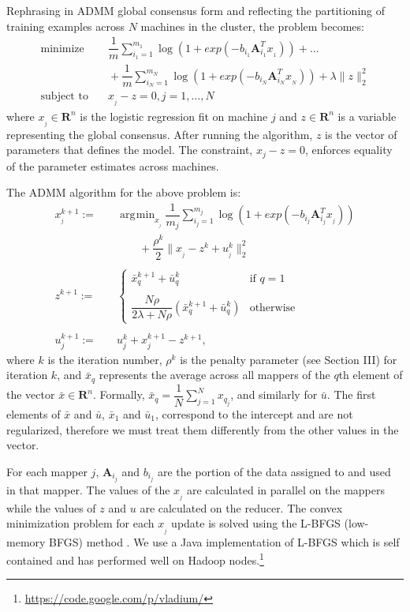 \documentclass[10pt, conference, compsocconf]{IEEEtran}
\DeclareMathOperator*{\argmin}{arg\!\min}
\begin{document}
Rephrasing in ADMM global consensus form and reflecting the partitioning of training examples across $N$ machines in the cluster, the problem becomes:
\begin{align*}
\text{minimize}&\quad \dfrac{1}{m}\sum_{i_1=1}^{m_1} \log(1 + exp(-b_{i_1}\mathbf{A}_{i_1}^Tx_{_1}))+\ldots \\
&\quad+\dfrac{1}{m}\sum_{i_N=1}^{m_N} \log(1 + exp(-b_{i_N}\mathbf{A}_{i_N}^Tx_{_N}))+\lambda\|z\|_2^2\\
\text{subject to}&\quad x_{_j} - z = 0, j = 1, \ldots, N
\end{align*}
where $x_{_j}\in\mathbf{R}^n$ is the logistic regression fit on machine $j$ and $z\in\mathbf{R}^n$ is a variable representing the global consensus.  After running the algorithm, $z$ is the vector of parameters that defines the model. The constraint, $x_j-z=0$, enforces equality of the parameter estimates across machines.

The ADMM algorithm for the above problem is:
\begin{align}
\label{eq:x}
x_{_j}^{k+1} :=&\quad \argmin_{x_{_j}} \dfrac{1}{m_j}\sum_{i_j=1}^{m_j} \log(1 + exp(-b_{i_j}\mathbf{A}_{i_j}^Tx_{_j})) \\
&\quad\quad\quad+ \dfrac{\rho^k}{2}\|x_{_j} - z^k + u_{_j}^k\|_2^2 \nonumber\\
\nonumber\\
\label{eq:z}
z^{k+1} :=&\quad \begin{cases}
    \bar{x}_q^{k+1} + \bar{u}_q^k& \text{if $q=1$}\\
    \\
    \dfrac{N\rho}{2\lambda + N\rho}(\bar{x}_q^{k+1} + \bar{u}_q^k)& \text{otherwise}
  \end{cases}\\
\nonumber\\
\label{eq:u}
u_j^{k+1} :=&\quad u_j^k + x_j^{k+1} - z^{k+1},
\end{align}
where $k$ is the iteration number, $\rho^k$ is the penalty parameter (see Section III) for iteration $k$, and $\bar{x}_q$ represents the average across all mappers of the $q$th element of the vector $\bar{x}\in\mathbf{R}^n$.  Formally, $\bar{x}_q = \dfrac{1}{N}\sum_{j=1}^N x_{q_j}$, and similarly for $\bar{u}$.  The first elements of $\bar{x}$ and $\bar{u}$, $\bar{x}_1$ and $\bar{u}_1$, correspond to the intercept and are not regularized, therefore we must treat them differently from the other values in the vector.

For each mapper $j$, $\mathbf{A}_{i_j}$ and $b_{i_j}$ are the portion of the data assigned to and used in that mapper.  The values of the $x_{_j}$ are calculated in parallel on the mappers while the values of $z$ and $u$ are calculated on the reducer.  The convex minimization problem for each $x_{_j}$ update is solved using the L-BFGS (low-memory BFGS) method \cite{bonnans2003numerical}.  We use a Java implementation of L-BFGS which is self contained and has performed well on Hadoop nodes.\footnote{\url{https://code.google.com/p/vladium/}}
\end{document}
